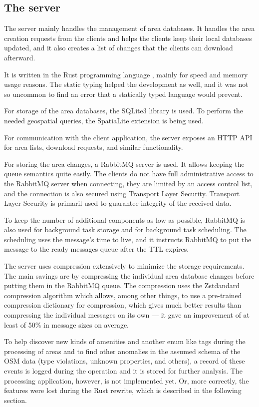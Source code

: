 \documentclass[nolof,digital]{fithesis3}
\begin{document}
\subsection{The server}
The server mainly handles the management of area databases. It handles the area creation requests from the clients and helps the clients keep their local databases updated, and it also creates a list of changes that the clients can download afterward.

It is written in the Rust programming language \parencite{rust}, mainly for speed and memory usage reasons. The static typing helped the development as well, and it was not so uncommon to find an error that a statically typed language would prevent.

For storage of the area databases, the SQLite3 library \parencite{sqlite} is used. To perform the needed geospatial queries, the SpatiaLite extension \parencite{spatialite} is being used.

For communication with the client application, the server exposes an HTTP API for area lists, download requests, and similar functionality. 

For storing the area changes, a RabbitMQ \parencite{rabbitmq} server is used. It allows keeping the queue semantics quite easily. The clients do not have full administrative access to the RabbitMQ server when connecting, they are limited by an access control list, and the connection is also secured using Transport Layer Security. Transport Layer Security is primaril used to guarantee integrity of the received data.

To keep the number of additional components as low as possible, RabbitMQ is also used for background task storage and for background task scheduling. The scheduling uses the message's time to live, and it instructs RabbitMQ to put the message to the ready messages queue after the TTL expires.

The server uses compression extensively to minimize the storage requirements. The main savings are by compressing the individual area database changes before putting them in the RabbitMQ queue. The compression uses the Zstdandard compression algorithm \parencite{zstd} which allows, among other things, to use a pre-trained compression dictionary for compression, which gives much better results than compressing the individual messages on its own --- it gave an improvement of at least of 50\% in message sizes on average.

To help discover new kinds of amenities and another enum like tags during the processing of areas and to find other anomalies in the assumed schema of the OSM data (type violations, unknown properties, and others), a record of these events is logged during the operation and it is stored for further analysis. The processing application, however, is not implemented yet. Or, more correctly, the features were lost during the Rust rewrite, which is described in the following section.
\end{document}

